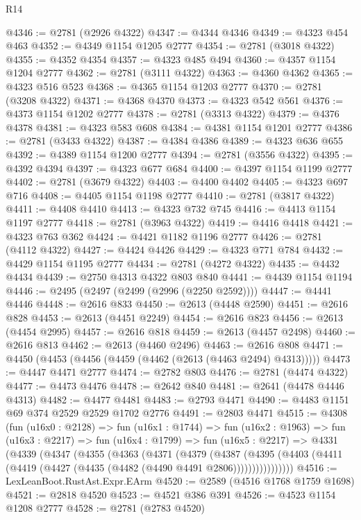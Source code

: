 \begin{lexlean}{R14}
\begin{coremodule}
@4346 := @2781 (@2926 @4322)
@4347 := @4344 @4346
@4349 := @4323 @454 @463
@4352 := @4349 @1154 @1205 @2777
@4354 := @2781 (@3018 @4322)
@4355 := @4352 @4354
@4357 := @4323 @485 @494
@4360 := @4357 @1154 @1204 @2777
@4362 := @2781 (@3111 @4322)
@4363 := @4360 @4362
@4365 := @4323 @516 @523
@4368 := @4365 @1154 @1203 @2777
@4370 := @2781 (@3208 @4322)
@4371 := @4368 @4370
@4373 := @4323 @542 @561
@4376 := @4373 @1154 @1202 @2777
@4378 := @2781 (@3313 @4322)
@4379 := @4376 @4378
@4381 := @4323 @583 @608
@4384 := @4381 @1154 @1201 @2777
@4386 := @2781 (@3433 @4322)
@4387 := @4384 @4386
@4389 := @4323 @636 @655
@4392 := @4389 @1154 @1200 @2777
@4394 := @2781 (@3556 @4322)
@4395 := @4392 @4394
@4397 := @4323 @677 @684
@4400 := @4397 @1154 @1199 @2777
@4402 := @2781 (@3679 @4322)
@4403 := @4400 @4402
@4405 := @4323 @697 @716
@4408 := @4405 @1154 @1198 @2777
@4410 := @2781 (@3817 @4322)
@4411 := @4408 @4410
@4413 := @4323 @732 @745
@4416 := @4413 @1154 @1197 @2777
@4418 := @2781 (@3963 @4322)
@4419 := @4416 @4418
@4421 := @4323 @763 @362
@4424 := @4421 @1182 @1196 @2777
@4426 := @2781 (@4112 @4322)
@4427 := @4424 @4426
@4429 := @4323 @771 @784
@4432 := @4429 @1154 @1195 @2777
@4434 := @2781 (@4272 @4322)
@4435 := @4432 @4434
@4439 := @2750 @4313 @4322 @803 @840
@4441 := @4439 @1154 @1194
@4446 := @2495 (@2497 (@2499 (@2996 (@2250 @2592))))
@4447 := @4441 @4446
@4448 := @2616 @833
@4450 := @2613 (@4448 @2590)
@4451 := @2616 @828
@4453 := @2613 (@4451 @2249)
@4454 := @2616 @823
@4456 := @2613 (@4454 @2995)
@4457 := @2616 @818
@4459 := @2613 (@4457 @2498)
@4460 := @2616 @813
@4462 := @2613 (@4460 @2496)
@4463 := @2616 @808
@4471 := @4450 (@4453 (@4456 (@4459 (@4462 (@2613 (@4463 @2494) @4313)))))
@4473 := @4447 @4471 @2777
@4474 := @2782 @803
@4476 := @2781 (@4474 @4322)
@4477 := @4473 @4476
@4478 := @2642 @840
@4481 := @2641 (@4478 @4446 @4313)
@4482 := @4477 @4481
@4483 := @2793 @4471
@4490 := @4483 @1151 @69 @374 @2529 @2529 @1702 @2776
@4491 := @2803 @4471
@4515 := @4308
    (fun (u16x0 : @2128) =>
    fun (u16x1 : @1744) =>
    fun (u16x2 : @1963) =>
    fun (u16x3 : @2217) =>
    fun (u16x4 : @1799) =>
    fun (u16x5 : @2217) =>
    @4331
      (@4339
        (@4347
          (@4355
            (@4363
              (@4371
                (@4379
                  (@4387
                    (@4395
                      (@4403 (@4411 (@4419 (@4427 (@4435 (@4482 (@4490 @4491 @2806))))))))))))))))
@4516 := LexLeanBoot.RustAst.Expr.EArm
@4520 := @2589 (@4516 @1768 @1759 @1698)
@4521 := @2818 @4520
@4523 := @4521 @386 @391
@4526 := @4523 @1154 @1208 @2777
@4528 := @2781 (@2783 @4520)

\end{coremodule}
\end{lexlean}
